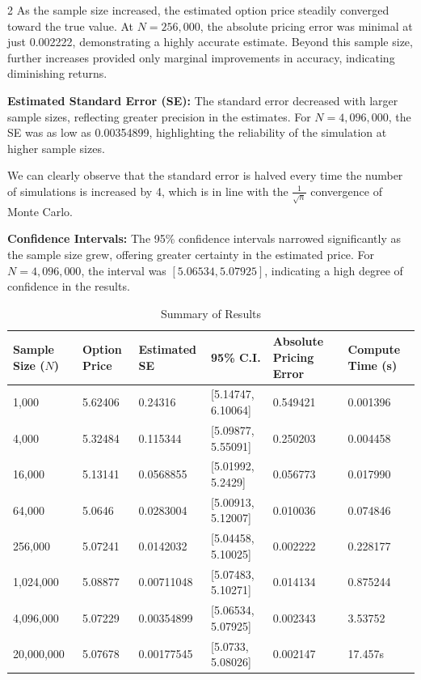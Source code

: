 \begin{multicols}{2}
As the sample size increased, the estimated option price steadily converged toward the true value. At \(N = 256,000\), the absolute pricing error was minimal at just 0.002222, demonstrating a highly accurate estimate. Beyond this sample size, further increases provided only marginal improvements in accuracy, indicating diminishing returns.


\textbf{Estimated Standard Error (SE):}  
The standard error decreased with larger sample sizes, reflecting greater precision in the estimates. For \(N = 4,096,000\), the SE was as low as 0.00354899, highlighting the reliability of the simulation at higher sample sizes. 

We can clearly observe that the standard error is halved every time the number of simulations is increased by 4, which is in line with the $\frac{1}{\sqrt{n}}$ convergence of Monte Carlo.

\textbf{Confidence Intervals:}  
The 95\% confidence intervals narrowed significantly as the sample size grew, offering greater certainty in the estimated price. For \(N = 4,096,000\), the interval was \([5.06534, 5.07925]\), indicating a high degree of confidence in the results.

\end{multicols}
\begin{table}[h!]
\centering
\caption{Summary of Results}
\begin{tabular}{|p{1.8cm}|p{1.8cm}|p{2cm}|p{4cm}|p{2cm}|p{2cm}|}
\hline
\textbf{Sample Size (\(N\))} & \textbf{Option Price} & \textbf{Estimated SE} & \textbf{95\% C.I.} & \textbf{Absolute Pricing Error} & \textbf{Compute Time (s)} \\ \hline
1,000      & 5.62406  & 0.24316   & [5.14747, 6.10064] & 0.549421  & 0.001396 \\ \hline
4,000      & 5.32484  & 0.115344  & [5.09877, 5.55091] & 0.250203  & 0.004458 \\ \hline
16,000     & 5.13141  & 0.0568855 & [5.01992, 5.2429]  & 0.056773  & 0.017990 \\ \hline
64,000     & 5.0646   & 0.0283004 & [5.00913, 5.12007] & 0.010036  & 0.074846 \\ \hline
256,000    & 5.07241  & 0.0142032 & [5.04458, 5.10025] & 0.002222  & 0.228177 \\ \hline
1,024,000  & 5.08877  & 0.00711048 & [5.07483, 5.10271] & 0.014134  & 0.875244 \\ \hline
4,096,000  & 5.07229  & 0.00354899 & [5.06534, 5.07925] & 0.002343  & 3.53752  \\ \hline
20,000,000  & 5.07678  & 0.00177545 & [5.0733, 5.08026] & 0.002147  & 17.457s  \\ \hline
\end{tabular}
\end{table}
